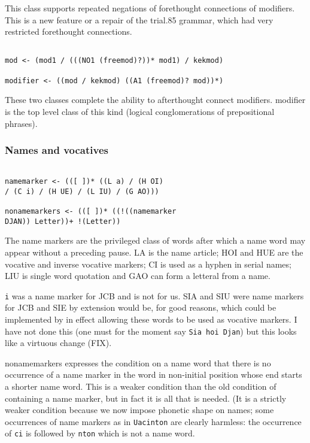 \documentclass[12pt]{article}
\begin{document}
This class supports repeated negations of forethought connections of modifiers.  This is a new feature or a repair
of the trial.85 grammar, which had very restricted forethought connections.

\begin{verbatim}

mod <- (mod1 / (((NO1 (freemod)?))* mod1) / kekmod)

modifier <- ((mod / kekmod) ((A1 (freemod)? mod))*)

\end{verbatim}

These two classes complete the ability to afterthought connect modifiers.  modifier is the top level class of this kind (logical conglomerations of prepositional phrases).

\subsubsection{Names and vocatives}

\begin{verbatim}

namemarker <- (([ ])* ((L a) / (H OI) 
/ (C i) / (H UE) / (L IU) / (G AO)))

nonamemarkers <- (([ ])* ((!((namemarker 
DJAN)) Letter))+ !(Letter))

\end{verbatim}

The name markers are the privileged class of words after which a name word may appear without a preceding pause.
LA is the name article;  HOI and HUE are the vocative and inverse vocative markers; CI  is used as a hyphen in serial names;
LIU is single word quotation and GAO can form a letteral from a name.

{\tt i} was a name marker for JCB and is not for us.  SIA and SIU were name markers for JCB and SIE by extension would be, 
for good reasons, which could be implemented by in effect allowing these words to be used as vocative markers.  I have not done this (one must for the moment say {\tt Sia hoi Djan}) but this looks like a virtuous change (FIX).

nonamemarkers expresses the condition on a name word that there is no occurrence of a name marker in the word
in non-initial position whose end starts a shorter name word.  This is a weaker condition than the old condition of containing a name marker, but in fact it is all that is needed.  (It is a strictly weaker condition because we now impose phonetic shape on names; some occurrences of name markers as in {\tt Uacinton} are clearly harmless:  the occurrence of {\tt ci} is followed by {\tt nton}
which is not a name word.
\end{document}
